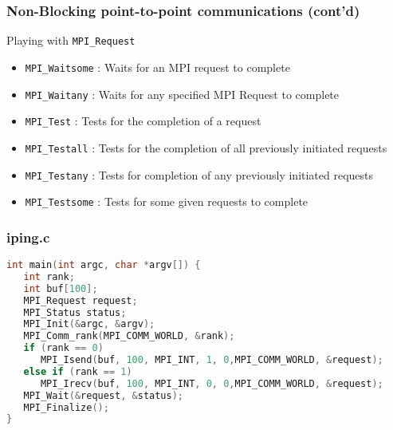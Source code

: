 %
%



\begin{frame}[containsverbatim]
\frametitle{Non-Blocking point-to-point communications (cont'd)}

Playing with \verb+MPI_Request+

\begin{itemize}
	\item {\verb+MPI_Waitsome+ : Waits for an MPI request to complete }
	\item {\verb+MPI_Waitany+ : Waits for any specified MPI Request to complete }
	\item {\verb+MPI_Test+ : Tests for the completion of a request }
	\item {\verb+MPI_Testall+ : Tests for the completion of all previously initiated requests }
	\item {\verb+MPI_Testany+ : Tests for completion of any previously initiated requests }
	\item {\verb+MPI_Testsome+ : Tests for some given requests to complete }
\end{itemize}
\end{frame}


\begin{frame}[containsverbatim]
\frametitle{iping.c}
\begin{lstlisting}[language=C,frame=lines]
int main(int argc, char *argv[]) {
   int rank;
   int buf[100];
   MPI_Request request;
   MPI_Status status;
   MPI_Init(&argc, &argv);
   MPI_Comm_rank(MPI_COMM_WORLD, &rank);
   if (rank == 0)
      MPI_Isend(buf, 100, MPI_INT, 1, 0,MPI_COMM_WORLD, &request);
   else if (rank == 1)
      MPI_Irecv(buf, 100, MPI_INT, 0, 0,MPI_COMM_WORLD, &request);
   MPI_Wait(&request, &status);
   MPI_Finalize();
}
\end{lstlisting}
\end{frame}


